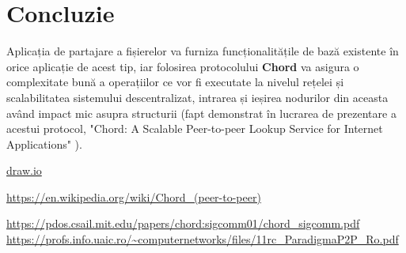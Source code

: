 \documentclass[runningheads]{llncs}
\begin{document}
\section{Concluzie}

Aplicația de partajare a fișierelor va furniza funcționalitățile de bază existente în orice aplicație de acest tip, iar folosirea protocolului \textbf{Chord} va asigura o complexitate bună a operațiilor ce vor fi executate la nivelul rețelei și scalabilitatea sistemului descentralizat, intrarea și ieșirea nodurilor din aceasta având impact mic asupra structurii (fapt demonstrat în lucrarea de prezentare a acestui protocol, "Chord: A Scalable Peer-to-peer Lookup Service for Internet Applications" \cite{ChordArticle}).

\begin{thebibliography}{9}
		
\url{draw.io}
		
\url{https://en.wikipedia.org/wiki/Chord_(peer-to-peer)}
		
\url{https://pdos.csail.mit.edu/papers/chord:sigcomm01/chord_sigcomm.pdf}		
\url{https://profs.info.uaic.ro/~computernetworks/files/11rc_ParadigmaP2P_Ro.pdf}		
		
\end{thebibliography}
\end{document}
